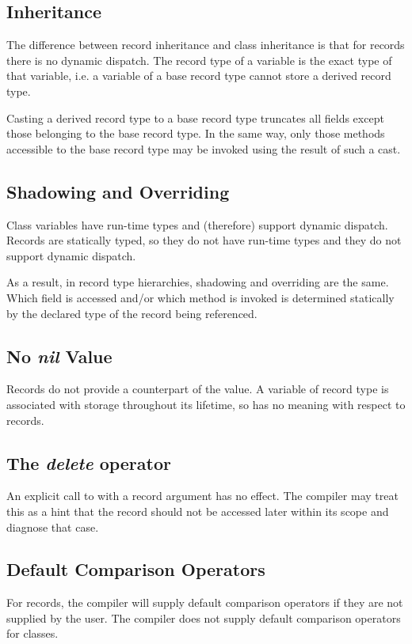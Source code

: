 \subsection{Inheritance}
\label{Inheritance_Differences}

The difference between record inheritance and class
inheritance is that for records there is no dynamic dispatch.  The record type of
a variable is the exact type of that variable, i.e. a variable of a
base record type cannot store a derived record type.

Casting a derived record type to a base record type truncates all 
fields except those belonging to the base record type.  In the same way, only
those methods accessible to the base record type may be invoked using the result
of such a cast.

\subsection{Shadowing and Overriding}
\label{Base_Method_Differences}

Class variables have run-time types and (therefore) support dynamic dispatch.
Records are statically typed, so they do not have run-time types and they do not
support dynamic dispatch.

As a result, in record type hierarchies, shadowing and overriding are the same.  
Which field is accessed
and/or which method is invoked is determined statically by the declared type of
the record being referenced.

\subsection{No {\em nil} Value}

Records do not provide a counterpart of the  value.  A variable of
record type is associated with storage throughout its lifetime, so 
has no meaning with respect to records.

\subsection{The {\em delete} operator}

An explicit call to  with a record argument has no effect.  The
compiler may treat this as a hint that the record should not be accessed later
within its scope and diagnose that case.

\subsection{Default Comparison Operators}
\label{Comparison_Operator_Differences}

For records, the compiler will supply default comparison operators if they are
not supplied by the user.  The compiler does not supply default comparison
operators for classes.

